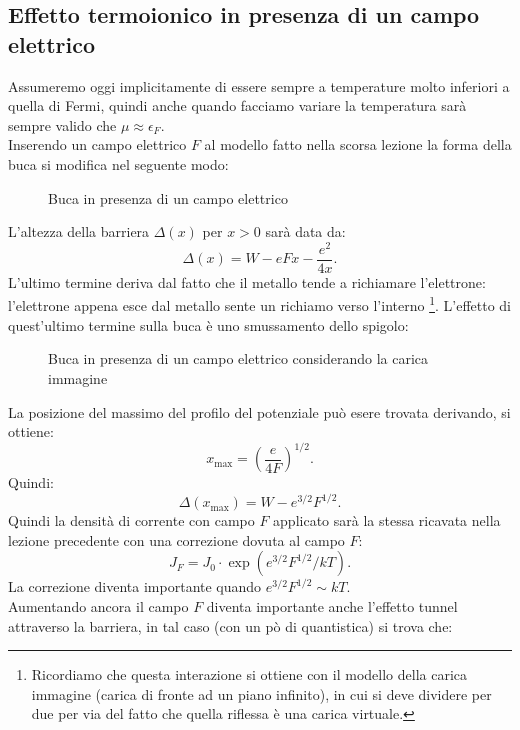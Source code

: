 \subsection{Effetto termoionico in presenza di un campo elettrico}%
Assumeremo oggi implicitamente di essere sempre a temperature molto inferiori a quella di Fermi, quindi anche quando facciamo variare la temperatura sarà sempre valido che $\mu \approx \epsilon _{F}$. \\
Inserendo un campo elettrico $F$ al modello fatto nella scorsa lezione la forma della buca si modifica nel seguente modo:
\begin{figure}[H]
    \centering
    \caption{\scriptsize Buca in presenza di un campo elettrico}
    \label{fig:buca-in-presenza-di-un-campo-elettrico}
\end{figure}
\noindent
L'altezza della barriera $\Delta ( x) $ per $x > 0$ sarà data da:
\[
	\Delta ( x) = W - eFx - \frac{e^2}{4x}
.\] 
L'ultimo termine deriva dal fatto che il metallo tende a richiamare l'elettrone: l'elettrone appena esce dal metallo sente un richiamo verso l'interno \footnote{Ricordiamo che questa interazione si ottiene con il modello della carica immagine (carica di fronte ad un piano infinito), in cui si deve dividere per due per via del fatto che quella riflessa è una carica virtuale.}. L'effetto di quest'ultimo termine sulla buca è uno smussamento dello spigolo:
\begin{figure}[H]
    \centering
    \caption{\scriptsize Buca in presenza di un campo elettrico considerando la carica immagine}
    \label{fig:buca-in-presenza-di-un-campo-elettrico-considerando-la-carica-immagine}
\end{figure}
La posizione del massimo del profilo del potenziale può esere trovata derivando, si ottiene:
\[
	x_{\text{max}}= \left( \frac{e}{4F} \right) ^{1 /2}
.\] 
Quindi:
\[
	\Delta ( x_{\text{max}}) = W - e^{3 /2}F^{1 /2}
.\] Quindi la densità di corrente con campo $F$ applicato sarà la stessa ricavata nella lezione precedente con una correzione dovuta al campo $F$:
\[
	J_{F}= J_0\cdot \exp\left( e^{3 /2}F^{1 /2} /kT \right) 
.\] 
La correzione diventa importante quando $e^{3 /2}F^{1 /2} \sim kT$.\\
Aumentando ancora il campo $F$ diventa importante anche l'effetto tunnel attraverso la barriera, in tal caso (con un pò di quantistica) si trova che:

